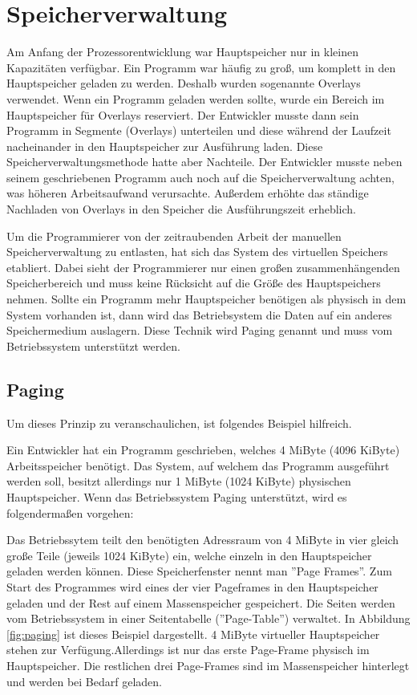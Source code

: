 \documentclass[a4paper,12pt]{article}
\begin{document}
\section{Speicherverwaltung}
Am Anfang der Prozessorentwicklung war Hauptspeicher nur in kleinen Kapazitäten verfügbar. Ein Programm war häufig zu groß, um komplett in den Hauptspeicher geladen zu werden. Deshalb wurden sogenannte Overlays verwendet. Wenn ein Programm geladen werden sollte, wurde ein Bereich im Hauptspeicher für Overlays reserviert. Der Entwickler musste dann sein Programm in Segmente (Overlays) unterteilen und diese während der Laufzeit nacheinander in den Hauptspeicher zur Ausführung laden. Diese Speicherverwaltungsmethode hatte aber Nachteile. Der Entwickler musste neben seinem geschriebenen Programm auch noch auf die Speicherverwaltung achten, was höheren Arbeitsaufwand verursachte. Außerdem erhöhte das ständige Nachladen von Overlays in den Speicher die Ausführungszeit erheblich. \cite[S.173]{mikroprozessortechnik2011}


Um die Programmierer von der zeitraubenden Arbeit der manuellen Speicherverwaltung zu entlasten, hat sich das System des virtuellen Speichers etabliert. Dabei sieht der Programmierer nur einen großen zusammenhängenden Speicherbereich und muss keine Rücksicht auf die Größe des Hauptspeichers nehmen. Sollte ein Programm mehr Hauptspeicher benötigen als physisch in dem System vorhanden ist, dann wird das Betriebsystem die Daten auf ein anderes Speichermedium auslagern. Diese Technik wird Paging genannt und muss vom Betriebssystem unterstützt werden.

\subsection{Paging}
Um dieses Prinzip zu veranschaulichen, ist folgendes Beispiel hilfreich. 
\par\smallskip\noindent Ein Entwickler hat ein Programm geschrieben, welches 4 MiByte (4096 KiByte) Arbeitsspeicher benötigt. Das System, auf welchem das Programm ausgeführt werden soll, besitzt allerdings nur 1 MiByte (1024 KiByte) physischen Hauptspeicher. Wenn das Betriebssystem Paging unterstützt, wird es folgendermaßen vorgehen:
\par\smallskip\noindent Das Betriebssytem teilt den benötigten Adressraum von 4 MiByte in vier gleich große Teile (jeweils 1024 KiByte) ein, welche einzeln in den Hauptspeicher geladen werden können. Diese Speicherfenster nennt man ''Page Frames''. Zum Start des Programmes wird eines der vier Pageframes in den Hauptspeicher geladen und der Rest auf einem Massenspeicher gespeichert. Die Seiten werden vom Betriebssystem in einer Seitentabelle (''Page-Table'') verwaltet.  In Abbildung \ref{fig:paging} ist dieses Beispiel dargestellt. 4 MiByte virtueller Hauptspeicher stehen zur Verfügung.\newline Allerdings ist nur das erste Page-Frame physisch im Hauptspeicher. Die restlichen drei Page-Frames sind im Massenspeicher hinterlegt und werden bei Bedarf geladen.
\end{document}

